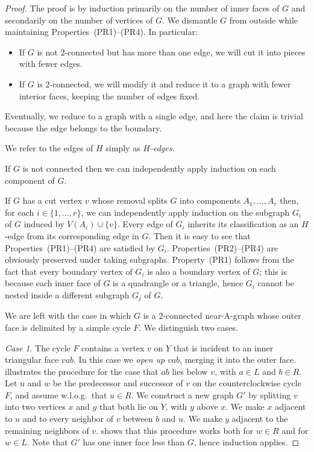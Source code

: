 \begin{proof}
	The proof is by induction primarily on the number of inner faces of $G$ and secondarily on the number of vertices of $G$. We dismantle $G$
	from outside while maintaining
	Properties~(PR1)--(PR4). In particular:
	\begin{itemize}
		\item If $G$ is not 2-connected but has more than one
                  edge, we will cut it
		into pieces with fewer edges.
		\item If $G$ is 2-connected, we will modify it and reduce it to a
		graph
		with fewer interior faces,
		keeping the number of edges fixed.
	\end{itemize}
	Eventually, we reduce to a graph with a single edge, and here the
	claim is trivial because the edge belongs to the boundary.
	
	We refer to the edges of $H$ simply as \emph{$H$-edges}.
	
	If $G$ is not connected then we can independently apply induction on each component
	of $G$. 
	
	If $G$ has a cut vertex $v$ whose removal
	splits $G$ into components $A_1,\ldots,A_r$ then, for each
	$i\in\{1,\ldots,r\}$, we can independently apply induction on the subgraph $G_i$ of $G$
	induced by $V(A_i)\cup\{v\}$. Every edge of $G_i$ inherits its
        classification as an $H$-edge from its corresponding edge in
        $G$.
        Then it is easy to see that Properties~(PR1)--(PR4) are
        satisfied by $G_i$.
        Properties~(PR2)--(PR4) are obviously preserved under taking subgraphs. 
        Property~(PR1) follows from the fact that every boundary vertex of $G_i$ is also a boundary vertex of $G$; this is because each inner face of $G$ is a quadrangle or a triangle, hence $G_i$ cannot be nested inside a different subgraph $G_j$ of $G$.
		
	We are left with the case in which $G$ is a 2-connected near-A-graph whose outer face 
	is delimited by a simple cycle $F$. We distinguish two cases.
	
	{\em Case 1}. The cycle $F$ contains a vertex $v$ on $Y$ that is incident to an inner triangular face $vab$. In this case
        we \emph{open up} $vab$, merging it into the outer face.  illustrates the procedure for the case that $ab$ lies below $v$, with $a\in L$ and $b\in R$. Let $u$ and $w$ be the predecessor and successor of $v$ on the
	counterclockwise cycle $F$, and assume w.l.o.g.\ that $u\in R$.
	We construct a new graph $G'$ by splitting $v$ into two vertices $x$
	and $y$ that both lie on $Y$, with $y$ above $x$. We make $x$ adjacent to $u$ and to every neighbor of $v$ between $b$ and $u$.
	We make $y$ adjacent to the remaining neighbors of $v$.
	 shows that this procedure works both for $w\in R$
	and for $w\in L$. Note that $G'$ has one inner face less than $G$, hence induction applies.
		

\end{proof}
